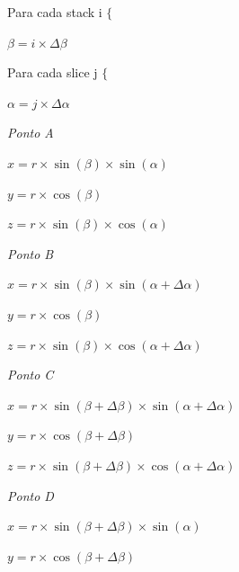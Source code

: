 \documentclass{article}
\begin{document}
Para cada stack i $\{$\newline
\par $\beta = i \times \Delta\beta$ \newline
\par Para cada slice j $\{$ \newline
\par $\alpha = j \times \Delta\alpha$ \newline\newline
\par\textit{Ponto A} \newline
\par$x = r\times\sin(\beta)\times\sin(\alpha)$ \newline
\par$y = r\times\cos(\beta)$ \newline
\par$z = r\times\sin(\beta)\times\cos(\alpha)$ \newline\newline
\par\textit{Ponto B} \newline
\par$x = r\times\sin(\beta)\times\sin(\alpha + \Delta\alpha)$ \newline
\par$y = r\times\cos(\beta)$ \newline
\par$z = r\times\sin(\beta)\times\cos(\alpha + \Delta\alpha)$ \newline\newline
\par\textit{Ponto C} \newline
\par$x = r\times\sin(\beta + \Delta\beta)\times\sin(\alpha + \Delta\alpha)$ \newline
\par$y = r\times\cos(\beta + \Delta\beta)$ \newline
\par$z = r\times\sin(\beta + \Delta\beta)\times\cos(\alpha + \Delta\alpha)$ \newline\newline
\par\textit{Ponto D} \newline
\par$x = r\times\sin(\beta + \Delta\beta)\times\sin(\alpha)$ \newline
\par$y = r\times\cos(\beta + \Delta\beta)$ \newline
\end{document}
